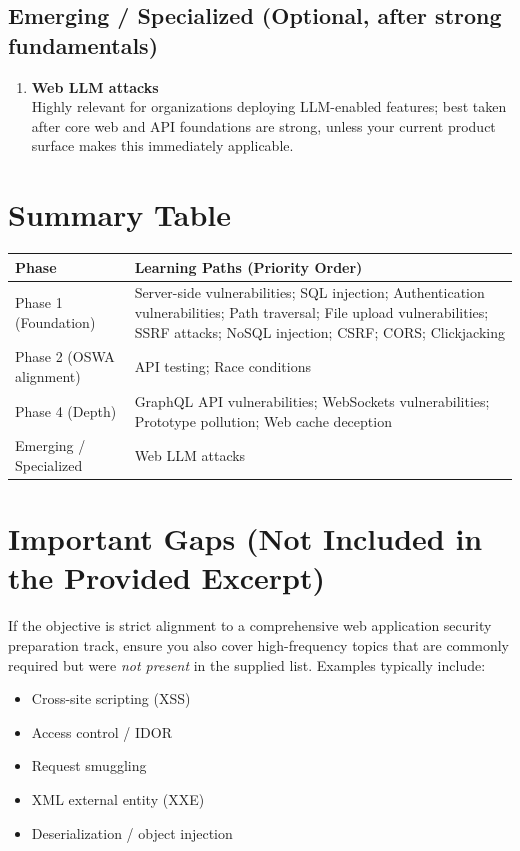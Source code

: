 \documentclass[11pt]{article}
\begin{document}
\subsection{Emerging / Specialized (Optional, after strong fundamentals)}
\begin{enumerate}[resume]
  \item \textbf{Web LLM attacks}\\
  Highly relevant for organizations deploying LLM-enabled features; best taken after core web and API foundations are strong, unless your current product surface makes this immediately applicable.
\end{enumerate}

\section{Summary Table}
\begin{table}[h!]
\centering
\renewcommand{\arraystretch}{1.2}
\begin{tabularx}{\textwidth}{@{} l X @{}}
\toprule
\textbf{Phase} & \textbf{Learning Paths (Priority Order)} \\
\midrule
Phase 1 (Foundation) &
Server-side vulnerabilities; SQL injection; Authentication vulnerabilities; Path traversal; File upload vulnerabilities; SSRF attacks; NoSQL injection; CSRF; CORS; Clickjacking \\
\addlinespace
Phase 2 (OSWA alignment) &
API testing; Race conditions \\
\addlinespace
Phase 4 (Depth) &
GraphQL API vulnerabilities; WebSockets vulnerabilities; Prototype pollution; Web cache deception \\
\addlinespace
Emerging / Specialized &
Web LLM attacks \\
\bottomrule
\end{tabularx}
\end{table}

\section{Important Gaps (Not Included in the Provided Excerpt)}
If the objective is strict alignment to a comprehensive web application security preparation track, ensure you also cover high-frequency topics that are commonly required but were \emph{not present} in the supplied list. Examples typically include:
\begin{itemize}
  \item Cross-site scripting (XSS)
  \item Access control / IDOR
  \item Request smuggling
  \item XML external entity (XXE)
  \item Deserialization / object injection
\end{itemize}
\end{document}
